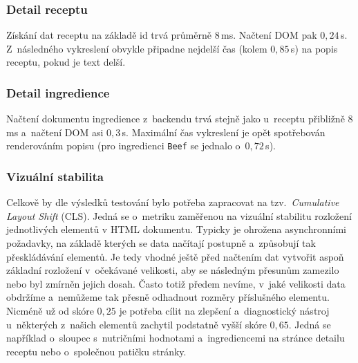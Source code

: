 \subsubsection{Detail receptu}

Získání dat receptu na základě id trvá průměrně $8\,$ms. Načtení DOM pak $0,24\,$s. Z~následného vykreslení obvykle připadne nejdelší čas (kolem $0,85\,$s) na popis receptu, pokud je text delší.

\subsubsection{Detail ingredience}

Načtení dokumentu ingredience z~backendu trvá stejně jako u~receptu přibližně $8\,$ms a~načtení DOM asi $0,3\,$s. Maximální čas vykreslení je opět spotřebován renderováním popisu (pro ingredienci \texttt{Beef} se jednalo o~$0,72\,$s).

\subsubsection{Vizuální stabilita}

Celkově by dle výsledků testování bylo potřeba zapracovat na tzv.~\emph{Cumulative Layout Shift} (CLS). Jedná se o~metriku zaměřenou na vizuální stabilitu rozložení jednotlivých elementů v HTML dokumentu. Typicky je ohrožena asynchronními požadavky, na základě kterých se data načítají postupně a~způsobují tak přeskládávání elementů. Je tedy vhodné ještě před načtením dat vytvořit aspoň základní rozložení v~očekávané velikosti, aby se následným přesunům zamezilo nebo byl zmírněn jejich dosah. Často totiž předem nevíme, v~jaké velikosti data obdržíme a~nemůžeme tak přesně odhadnout rozměry příslušného elementu. Nicméně už od skóre $0,25$ je potřeba cílit na zlepšení \citep{cls-metric} a~diagnostický nástroj u~některých z~našich elementů zachytil podstatně vyšší skóre $0,65$. Jedná se například o~sloupec s~nutričními hodnotami a~ingrediencemi na stránce detailu receptu nebo o~společnou patičku stránky.